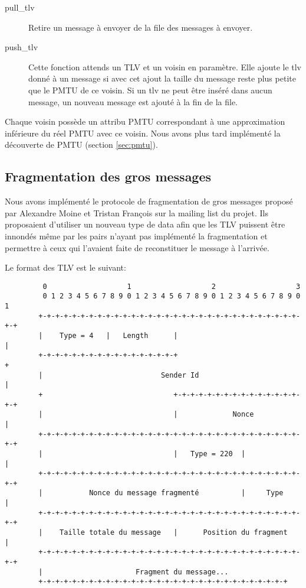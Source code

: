 \documentclass[a4paper,10pt]{article} %
\begin{document}
\begin{description}
\item[pull\_tlv] Retire un message à envoyer de la file des messages à envoyer.
\item[push\_tlv] Cette fonction attends un TLV et un voisin en paramètre. Elle ajoute le tlv donné à un message si avec cet ajout la taille du message reste plus petite que le PMTU de ce voisin. Si un tlv ne peut être inséré dans aucun message, un nouveau message est ajouté à la fin de la file.
\end{description}

Chaque voisin possède un attribu \textrm{PMTU} correspondant à une approximation inférieure du réel \textrm{PMTU} avec ce voisin. Nous avons plus tard implémenté la découverte de PMTU (section \ref{sec:pmtu}).


\subsection{Fragmentation des gros messages\label{sec:frag}}
Nous avons implémenté le protocole de fragmentation de gros messages proposé par \textrm{Alexandre Moine} et \textrm{Tristan François} sur la mailing list du projet. Ils proposaient d'utiliser un nouveau type de data afin que les TLV puissent être innondés même par les pairs n'ayant pas implémenté la fragmentation et permettre à ceux qui l'avaient faite de reconstituer le message à l'arrivée.

Le format des TLV est le suivant:

\begin{verbatim}
         0                   1                   2                   3
         0 1 2 3 4 5 6 7 8 9 0 1 2 3 4 5 6 7 8 9 0 1 2 3 4 5 6 7 8 9 0 1
        +-+-+-+-+-+-+-+-+-+-+-+-+-+-+-+-+-+-+-+-+-+-+-+-+-+-+-+-+-+-+-+-+
        |    Type = 4   |   Length      |                               |
        +-+-+-+-+-+-+-+-+-+-+-+-+-+-+-+-+                               +
        |                            Sender Id                          |
        +                               +-+-+-+-+-+-+-+-+-+-+-+-+-+-+-+-+
        |                               |             Nonce             |
        +-+-+-+-+-+-+-+-+-+-+-+-+-+-+-+-+-+-+-+-+-+-+-+-+-+-+-+-+-+-+-+-+
        |                               |   Type = 220  |               |
        +-+-+-+-+-+-+-+-+-+-+-+-+-+-+-+-+-+-+-+-+-+-+-+-+-+-+-+-+-+-+-+-+
        |           Nonce du message fragmenté          |     Type      |
        +-+-+-+-+-+-+-+-+-+-+-+-+-+-+-+-+-+-+-+-+-+-+-+-+-+-+-+-+-+-+-+-+
        |    Taille totale du message   |      Position du fragment     |
        +-+-+-+-+-+-+-+-+-+-+-+-+-+-+-+-+-+-+-+-+-+-+-+-+-+-+-+-+-+-+-+-+
        |                      Fragment du message...
        +-+-+-+-+-+-+-+-+-+-+-+-+-+-+-+-+-+-+-+-+-+-+-+-+-+-+-+-+-+
\end{verbatim}
\end{document}
